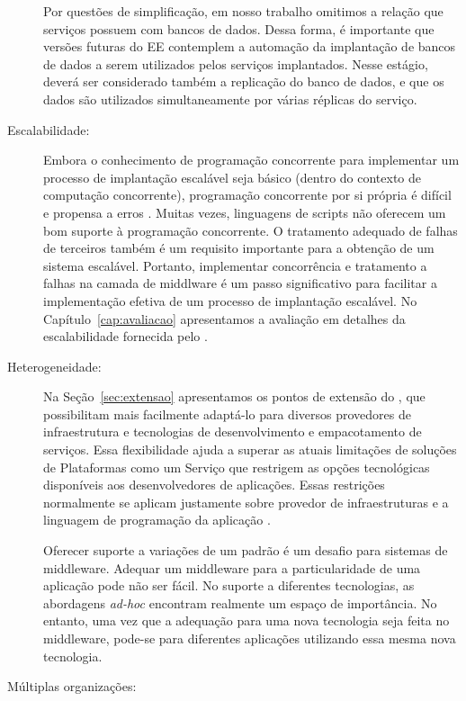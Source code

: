 \begin{description}
Por questões de simplificação, em nosso trabalho omitimos a relação que serviços possuem com bancos de dados.
Dessa forma, é importante que versões futuras do EE contemplem a automação da implantação de bancos de dados
a serem utilizados pelos serviços implantados. Nesse estágio, deverá ser considerado também a replicação
do banco de dados, e que os dados são utilizados simultaneamente por várias réplicas do serviço.

\item [Escalabilidade:]

Embora o conhecimento de programação concorrente para implementar
um processo de implantação escalável seja básico (dentro do contexto de computação concorrente),
programação concorrente por si própria é difícil e propensa a erros .
Muitas vezes, linguagens de scripts não oferecem um bom suporte à programação concorrente.
O tratamento adequado de falhas de terceiros também é um requisito importante
para a obtenção de um sistema escalável.
Portanto, implementar concorrência e tratamento a falhas na camada de middlware
é um passo significativo para facilitar a implementação efetiva de um
processo de implantação escalável.
No Capítulo~\ref{cap:avaliacao} apresentamos a avaliação em detalhes da 
escalabilidade fornecida pelo \ee.

\item [Heterogeneidade:]

Na Seção~\ref{sec:extensao} apresentamos os pontos de extensão do \ee,
que possibilitam mais facilmente adaptá-lo para diversos provedores de infraestrutura
e tecnologias de desenvolvimento e empacotamento de serviços.
Essa flexibilidade ajuda a superar
as atuais limitações de soluções de Plataformas como um Serviço
que restrigem as opções tecnológicas disponíveis aos desenvolvedores de aplicações.
Essas restrições normalmente se aplicam justamente sobre
provedor de infraestruturas e a linguagem de programação da aplicação .

Oferecer suporte a variações de um padrão é um desafio para sistemas de middleware.
Adequar um middleware para a particularidade de uma aplicação pode não ser fácil.
No suporte a diferentes tecnologias, as abordagens \emph{ad-hoc} encontram realmente um espaço de importância.
No entanto, uma vez que a adequação para uma nova tecnologia seja feita no middleware,
pode-se  para diferentes aplicações utilizando essa
mesma nova tecnologia.

\item [Múltiplas organizações:]


\end{description}
